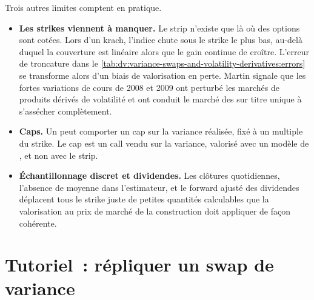 Trois autres limites comptent en pratique.
\begin{itemize}
\item \textbf{Les strikes viennent à manquer.} Le strip n'existe que là où des options sont cotées. Lors d'un krach, l'indice chute
sous le strike le plus bas, au-delà duquel la couverture est linéaire alors que le gain continue de croître. L'erreur de troncature
dans le \cref{tab:dv:variance-swaps-and-volatility-derivatives:errors} se transforme alors d'un biais de valorisation en perte. Martin signale que les fortes variations de cours de
2008 et 2009 ont perturbé les marchés de produits dérivés de volatilité et ont conduit le marché des  sur titre unique à s'assécher complètement.
\item \textbf{Caps.} Un  peut comporter un cap sur la variance réalisée, fixé à un multiple du strike. Le
cap est un call vendu sur la variance, valorisé avec un modèle de , et non avec le strip.
\item \textbf{Échantillonnage discret et dividendes.} Les clôtures quotidiennes, l'absence de moyenne dans l'estimateur, et le
forward ajusté des dividendes déplacent tous le strike juste de petites quantités calculables que la
valorisation au prix de marché de la construction doit appliquer de façon cohérente.
\end{itemize}

\section{Tutoriel~: répliquer un swap de variance}\label{tut:dv:variance-swaps-and-volatility-derivatives:tut}

